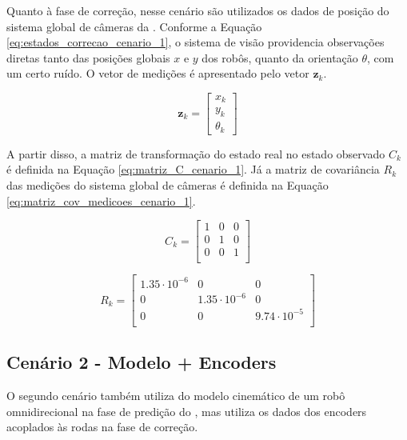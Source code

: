 \documentclass[acronym, symbols, table]{fei}
\begin{document}
			 Quanto à fase de correção, nesse cenário são utilizados os dados de posição do sistema global de câmeras da . Conforme a Equação \eqref{eq:estados_correcao_cenario_1}, o sistema de visão providencia observações diretas tanto das posições globais $x$ e $y$ dos robôs, quanto da orientação $\theta$, com um certo ruído. O vetor de medições é apresentado pelo vetor $\textbf{z}_k$.
			 
	 		\begin{equation}\label{eq:estados_correcao_cenario_1}
			 	\textbf{z}_k  = 
			 	\begin{bmatrix}
			 		x_k \\
			 		y_k \\
			 		\theta_k
			 	\end{bmatrix}
			\end{equation}
		 
		 	A partir disso, a matriz de transformação do estado real no estado observado $C_k$ é definida na Equação \eqref{eq:matriz_C_cenario_1}. Já a matriz de covariância $R_{k}$ das medições do sistema global de câmeras é definida na Equação \eqref{eq:matriz_cov_medicoes_cenario_1}.
			 
			\begin{equation}\label{eq:matriz_C_cenario_1}
			 	C_{k} = \begin{bmatrix}
			 		1 & 0 & 0 \\
			 		0 & 1 & 0 \\
			 		0 & 0 & 1 \\
			 	\end{bmatrix}
		 	\end{equation}
	 	
	 		\begin{equation} \label{eq:matriz_cov_medicoes_cenario_1}
	 			R_{k} = \begin{bmatrix}
	 				1.35\cdot10^{-6} & 0 & 0 \\
	 				0 & 1.35\cdot10^{-6} & 0 \\
	 				0 & 0 & 9.74\cdot10^{-5} \\
	 			\end{bmatrix}
	 		\end{equation}
		
		\subsection{Cenário 2 - Modelo + Encoders} \label{sec:implementacao_cenario_2}
		
			O segundo cenário também utiliza do modelo cinemático de um robô omnidirecional na fase de predição do , mas utiliza os dados dos encoders acoplados às rodas na fase de correção.
			
\end{document}
